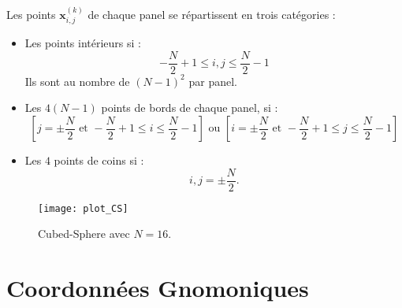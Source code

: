 Les points $\mathbf{x}_{i,j}^{(k)}$ de chaque panel se répartissent en trois catégories :
\begin{itemize}
\item Les points intérieurs si :
\begin{equation}
- \dfrac{N}{2}+1 \leq i,j \leq \dfrac{N}{2}-1
\end{equation}
Ils sont au nombre de $(N-1)^2$ par panel.
\item Les $4(N-1)$ points de bords de chaque panel, si :
\begin{equation}
\left[ j=\pm \dfrac{N}{2} \text{ et } - \dfrac{N}{2}+1 \leq i \leq \dfrac{N}{2}-1 \right] \text{ ou } \left[ i=\pm \dfrac{N}{2} \text{ et } - \dfrac{N}{2}+1 \leq j \leq \dfrac{N}{2}-1 \right]
\end{equation}
\item Les $4$ points de coins si :
\begin{equation}
i, j = \pm \dfrac{N}{2}.
\end{equation}
\end{itemize}



\begin{figure}
\begin{center}
\texttt{[image: plot\_CS]}
\end{center}
\caption{Cubed-Sphere avec $N=16$.}
\end{figure}















\section{Coordonnées Gnomoniques}
\label{sec:gnomonique}

